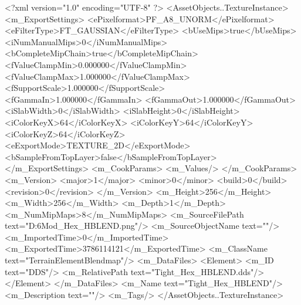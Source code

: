 <?xml version="1.0" encoding="UTF-8" ?>
<AssetObjects..TextureInstance>
	<m_ExportSettings>
		<ePixelformat>PF_A8_UNORM</ePixelformat>
		<eFilterType>FT_GAUSSIAN</eFilterType>
		<bUseMips>true</bUseMips>
		<iNumManualMips>0</iNumManualMips>
		<bCompleteMipChain>true</bCompleteMipChain>
		<fValueClampMin>0.000000</fValueClampMin>
		<fValueClampMax>1.000000</fValueClampMax>
		<fSupportScale>1.000000</fSupportScale>
		<fGammaIn>1.000000</fGammaIn>
		<fGammaOut>1.000000</fGammaOut>
		<iSlabWidth>0</iSlabWidth>
		<iSlabHeight>0</iSlabHeight>
		<iColorKeyX>64</iColorKeyX>
		<iColorKeyY>64</iColorKeyY>
		<iColorKeyZ>64</iColorKeyZ>
		<eExportMode>TEXTURE_2D</eExportMode>
		<bSampleFromTopLayer>false</bSampleFromTopLayer>
	</m_ExportSettings>
	<m_CookParams>
		<m_Values/>
	</m_CookParams>
	<m_Version>
		<major>1</major>
		<minor>0</minor>
		<build>0</build>
		<revision>0</revision>
	</m_Version>
	<m_Height>256</m_Height>
	<m_Width>256</m_Width>
	<m_Depth>1</m_Depth>
	<m_NumMipMaps>8</m_NumMipMaps>
	<m_SourceFilePath text="D:\Civ6Mod\Terrain\Hills\Tight_Hex_HBLEND.png"/>
	<m_SourceObjectName text=""/>
	<m_ImportedTime>0</m_ImportedTime>
	<m_ExportedTime>3786114121</m_ExportedTime>
	<m_ClassName text="TerrainElementBlendmap"/>
	<m_DataFiles>
		<Element>
			<m_ID text="DDS"/>
			<m_RelativePath text="Tight_Hex_HBLEND.dds"/>
		</Element>
	</m_DataFiles>
	<m_Name text="Tight_Hex_HBLEND"/>
	<m_Description text=""/>
	<m_Tags/>
</AssetObjects..TextureInstance>

